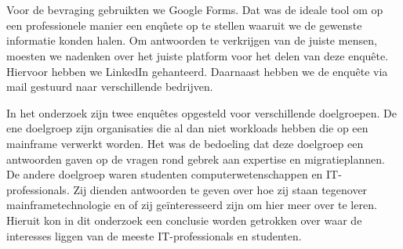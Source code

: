 \section{}
\label{sec:De bevraging}

Voor de bevraging gebruikten we Google Forms. Dat was de ideale tool om op een professionele manier een enqûete op te stellen waaruit we de gewenste informatie konden halen. Om antwoorden te verkrijgen van de juiste mensen, moesten we nadenken over het juiste platform voor het delen van deze enquête. Hiervoor hebben we LinkedIn gehanteerd. Daarnaast hebben we de enquête via mail gestuurd naar verschillende bedrijven. 

In het onderzoek zijn twee enquêtes opgesteld voor verschillende doelgroepen. De ene doelgroep zijn organisaties die al dan niet workloads hebben die op een mainframe verwerkt worden. Het was de bedoeling dat deze doelgroep een antwoorden gaven op de vragen rond gebrek aan expertise en migratieplannen. De andere doelgroep waren studenten computerwetenschappen en IT-professionals. Zij dienden antwoorden te geven over hoe zij staan tegenover mainframetechnologie en of zij geïnteresseerd zijn om hier meer over te leren. Hieruit kon in dit onderzoek een conclusie worden getrokken over waar de interesses liggen van de meeste IT-professionals en studenten.

